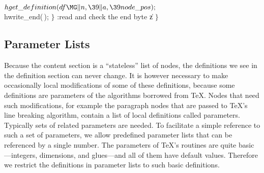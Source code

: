 ${}\index{hget definition+\\{hget\_definition}}\\{hget\_definition}(\index{df+\\{df}}\\{df}\MG\|n,\39\|a,\39\\{node\_pos});{}$\6
\\{hwrite\_end}(\,);\6
\4${}\}{}$\2\6
:read and check the end byte \|z\X\6
\4${}\}{}$\2
\Y
\fi




\subsection{Parameter Lists}\label{paramlist}
Because the content section is a ``stateless'' list of nodes, the
definitions we see in the definition section can never change. It is
however necessary to make occasionally local modifications of some of
these definitions, because some definitions are parameters of the
algorithms borrowed from \TeX. Nodes that need such modifications, for
example the paragraph nodes that are passed to \TeX's line breaking
algorithm, contain a list of local definitions called parameters.
Typically sets of related parameters are needed.  To facilitate a
simple reference to such a set of parameters, we allow predefined
parameter lists that can be referenced by a single number.  The
parameters of \TeX's routines are quite basic---integers,
dimensions, and glues---and all
of them have default values.
Therefore we restrict the definitions in parameter lists to such
basic definitions.

